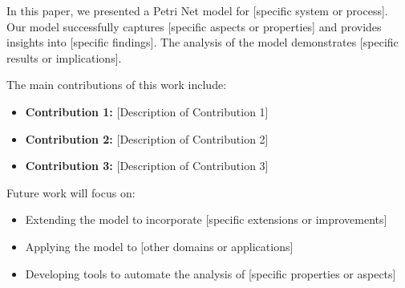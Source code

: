\label{sec:conclusion}

In this paper, we presented a Petri Net model for [specific system or process]. Our model successfully captures [specific aspects or properties] and provides insights into [specific findings]. The analysis of the model demonstrates [specific results or implications].

The main contributions of this work include:
\begin{itemize}[leftmargin=*]
    \item \textbf{Contribution 1:} [Description of Contribution 1]
    \item \textbf{Contribution 2:} [Description of Contribution 2]
    \item \textbf{Contribution 3:} [Description of Contribution 3]
\end{itemize}

Future work will focus on:
\begin{itemize}
    \item Extending the model to incorporate [specific extensions or improvements]
    \item Applying the model to [other domains or applications]
    \item Developing tools to automate the analysis of [specific properties or aspects]
\end{itemize}